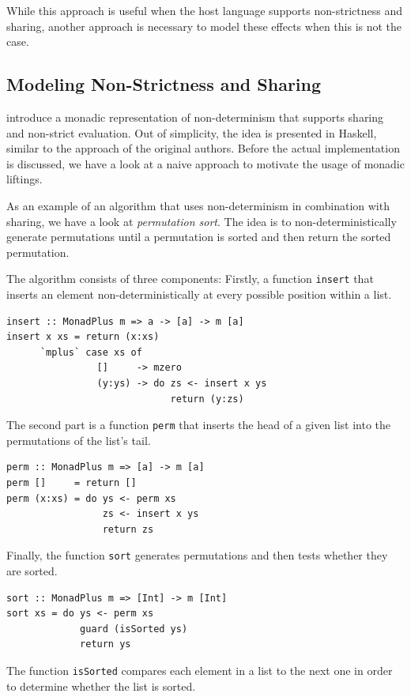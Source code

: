 \documentclass[a4paper, 11pt, fleqn, twoside, abstract=on]{scrreprt}
\newcommand{\hinl}[1]{\texttt{#1}}
\begin{document}
While this approach is useful when the host language supports non-strictness and sharing, another approach is necessary to model these effects when this is not the case.

\subsection{Modeling Non-Strictness and Sharing}
\label{subsec:monadicLifting}
\citet{fischer2009purely} introduce a monadic representation of non-determinism that supports sharing and non-strict evaluation.
Out of simplicity, the idea is presented in Haskell, similar to the approach of the original authors.
Before the actual implementation is discussed, we have a look at a naive approach to motivate the usage of monadic liftings.

As an example of an algorithm that uses non-determinism in combination with sharing, we have a look at \textit{permutation sort}.
The idea is to non-deterministically generate permutations until a permutation is sorted and then return the sorted permutation.

The algorithm consists of three components: Firstly, a function \hinl{insert} that inserts an element non-deterministically at every possible position within a list.

\begin{verbatim}
insert :: MonadPlus m => a -> [a] -> m [a]
insert x xs = return (x:xs)
      `mplus` case xs of
                []     -> mzero
                (y:ys) -> do zs <- insert x ys
                             return (y:zs)
\end{verbatim}
\noindent
The second part is a function \hinl{perm} that inserts the head of a given list into the permutations of the list's tail.

\begin{verbatim}
perm :: MonadPlus m => [a] -> m [a]
perm []     = return []
perm (x:xs) = do ys <- perm xs
                 zs <- insert x ys
                 return zs
\end{verbatim}
\noindent
Finally, the function \hinl{sort} generates permutations and then tests whether they are sorted.

\begin{verbatim}
sort :: MonadPlus m => [Int] -> m [Int]
sort xs = do ys <- perm xs
             guard (isSorted ys)
             return ys
\end{verbatim}
\noindent
The function \hinl{isSorted} compares each element in a list to the next one in order to determine whether the list is sorted.
\end{document}
